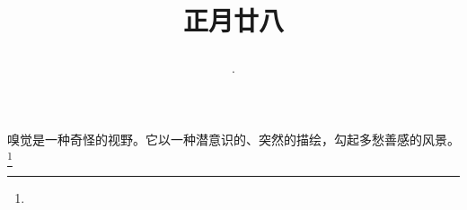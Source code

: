 \title{\date[d=8,m=3,y=2024][year:cn-y,年,month:cn,day:cn,日,·,weekday]·正月廿八 }
嗅觉是一种奇怪的视野。它以一种潜意识的、突然的描绘，勾起多愁善感的风景。\footnote{ }

